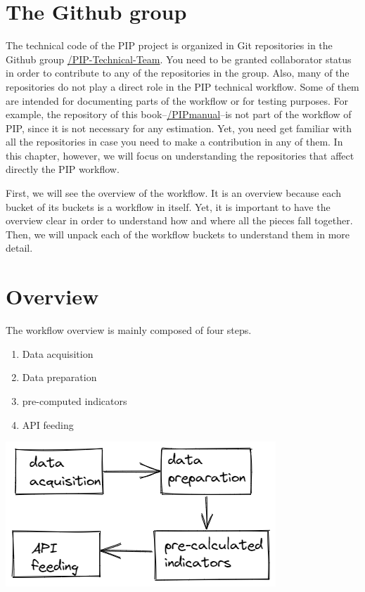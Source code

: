 \documentclass[
]{book}
\providecommand{\tightlist}{%
  \setlength{\itemsep}{0pt}\setlength{\parskip}{0pt}}
\begin{document}
\hypertarget{the-github-group}{%
\section{The Github group}\label{the-github-group}}

The technical code of the PIP project is organized in Git repositories in the
Github group \href{https://github.com/PIP-Technical-Team}{/PIP-Technical-Team}. You
need to be granted collaborator status in order to contribute to any of the
repositories in the group. Also, many of the repositories do not play a direct
role in the PIP technical workflow. Some of them are intended for documenting
parts of the workflow or for testing purposes. For example, the repository of
this book--\href{https://github.com/PIP-Technical-Team/PIPmanual}{/PIPmanual}--is not
part of the workflow of PIP, since it is not necessary for any estimation. Yet,
you need get familiar with all the repositories in case you need to make a
contribution in any of them. In this chapter, however, we will focus on
understanding the repositories that affect directly the PIP workflow.

First, we will see the overview of the workflow. It is an overview because each
bucket of its buckets is a workflow in itself. Yet, it is important to have the
overview clear in order to understand how and where all the pieces fall
together. Then, we will unpack each of the workflow buckets to understand them
in more detail.

\hypertarget{overview}{%
\section{Overview}\label{overview}}

The workflow overview is mainly composed of four steps.

\begin{enumerate}
\def\labelenumi{\arabic{enumi}.}
\tightlist
\item
  Data acquisition
\item
  Data preparation
\item
  pre-computed indicators
\item
  API feeding
\end{enumerate}

\includegraphics{img/PIP_workflow_overview.png}
\end{document}
